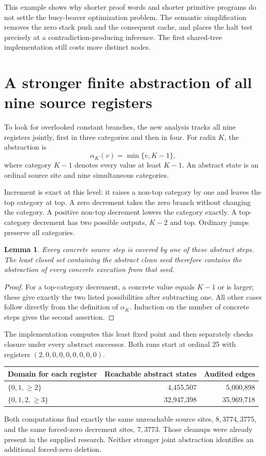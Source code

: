 \documentclass[11pt,letterpaper]{article}
\newtheorem{lemma}[proposition]{Lemma}
\begin{document}
This example shows why shorter proof words and shorter primitive
programs do not settle the busy-beaver optimization problem. The
semantic simplification removes the zero stack push and the consequent
cache, and places the halt test precisely at a contradiction-producing
inference. The first shared-tree implementation still costs more
distinct nodes.



\section{A stronger finite abstraction of all nine source registers}

To look for overlooked constant branches, the new analysis tracks all
nine registers jointly, first in three categories and then in four.
For radix \(K\), the abstraction is
\[
 \alpha_K(v)=\min\{v,K-1\},
\]
where category \(K-1\) denotes every value at least \(K-1\). An abstract
state is an ordinal source site and nine simultaneous categories.

Increment is exact at this level: it raises a non-top category by one
and leaves the top category at top. A zero decrement takes the zero
branch without changing the category. A positive non-top decrement
lowers the category exactly. A top-category decrement has two possible
outputs, \(K-2\) and top. Ordinary jumps preserve all categories.

\begin{lemma}
Every concrete source step is covered by one of these abstract steps.
The least closed set containing the abstract clean seed therefore
contains the abstraction of every concrete execution from that seed.
\end{lemma}
\begin{proof}
For a top-category decrement, a concrete value equals \(K-1\) or is
larger; these give exactly the two listed possibilities after subtracting
one. All other cases follow directly from the definition of
\(\alpha_K\). Induction on the number of concrete steps gives the
second assertion.
\end{proof}

The implementation computes this least fixed point and then separately
checks closure under every abstract successor. Both runs start at
ordinal 25 with registers \((2,0,0,0,0,0,0,0,0)\).

\begin{center}\small
\begin{tabular}{@{}lrr@{}}
\toprule
Domain for each register & Reachable abstract states & Audited edges\\
\midrule
\(\{0,1,\ge2\}\) & 4,455,507 & 5,000,898\\
\(\{0,1,2,\ge3\}\) & 32,947,398 & 35,969,718\\
\bottomrule
\end{tabular}
\end{center}
Both computations find exactly the same unreachable source sites,
\(8,3774,3775\), and the same forced-zero decrement sites,
\(7,3773\). Those cleanups were already present in the supplied research.
Neither stronger joint abstraction identifies an additional
forced-zero deletion.
\end{document}

